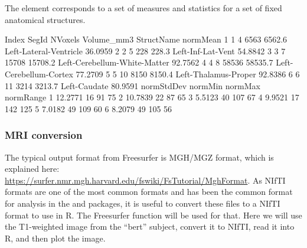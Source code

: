 The  element corresponds to a set of measures and statistics for a set of fixed anatomical structures.

\begin{Schunk}
\begin{Soutput}
  Index SegId NVoxels Volume_mm3                   StructName normMean
1     1     4    6563     6562.6       Left-Lateral-Ventricle  36.0959
2     2     5     228      228.3            Left-Inf-Lat-Vent  54.8842
3     3     7   15708    15708.2 Left-Cerebellum-White-Matter  92.7562
4     4     8   58536    58535.7       Left-Cerebellum-Cortex  77.2709
5     5    10    8150     8150.4         Left-Thalamus-Proper  92.8386
6     6    11    3214     3213.7                 Left-Caudate  80.9591
  normStdDev normMin normMax normRange
1    12.2771      16      91        75
2    10.7839      22      87        65
3     5.5123      40     107        67
4     9.9521      17     142       125
5     7.0182      49     109        60
6     8.2079      49     105        56
\end{Soutput}
\end{Schunk}

\subsubsection{MRI conversion}\label{mri-conversion}

The typical output format from Freesurfer is MGH/MGZ format, which is
explained here:
\url{https://surfer.nmr.mgh.harvard.edu/fswiki/FsTutorial/MghFormat}. As
NIfTI formats are one of the most common formats and has been the common
format for analysis in the  and  packages, it
is useful to convert these files to a NIfTI format to use in R. The
 Freesurfer function will be used for that. Here we
will use the T1-weighted image from the ``bert'' subject, convert it to
NIfTI, read it into R, and then plot the image.

